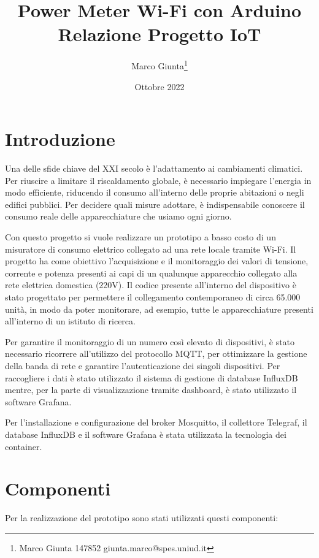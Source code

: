 \documentclass[italian,12pt,a4paper,oneside,final]{report}
\title{\huge Power Meter Wi-Fi con Arduino\\[0.5em]
\large Relazione Progetto IoT}
\date{Ottobre 2022}
\author{
Marco Giunta\thanks{Marco Giunta 147852 giunta.marco@spes.uniud.it}}
\begin{document}
\maketitle

\tableofcontents

\newpage

\section{Introduzione}
Una delle sfide chiave del XXI secolo è l’adattamento ai cambiamenti climatici.
Per riuscire a limitare il riscaldamento globale, è necessario impiegare l’energia in modo efficiente, riducendo il consumo all'interno delle proprie abitazioni o negli edifici pubblici.
Per decidere quali misure adottare, è indispensabile conoscere il consumo reale delle apparecchiature che usiamo ogni giorno.

Con questo progetto si vuole realizzare un prototipo a basso costo di un misuratore di consumo elettrico collegato ad una rete locale tramite \mbox{Wi-Fi}.
Il progetto ha come obiettivo l’acquisizione e il monitoraggio dei valori di tensione, corrente e potenza presenti ai capi di un qualunque apparecchio collegato alla rete elettrica domestica (220V).
Il codice presente all'interno del dispositivo è stato progettato per permettere il collegamento contemporaneo di circa 65.000 unità, in modo da poter monitorare, ad esempio, tutte le apparecchiature presenti all'interno di un istituto di ricerca.

Per garantire il monitoraggio di un numero così elevato di dispositivi, è stato necessario ricorrere all'utilizzo del protocollo MQTT, per ottimizzare la gestione della banda di rete e garantire l'autenticazione dei singoli dispositivi.
Per raccogliere i dati è stato utilizzato il sistema di gestione di database InfluxDB mentre, per la parte di visualizzazione tramite dashboard, è stato utilizzato il software Grafana.

Per l'installazione e configurazione del broker Mosquitto, il collettore Telegraf, il database InfluxDB e il software Grafana è stata utilizzata la tecnologia dei container.

\newpage

\section{Componenti}
Per la realizzazione del prototipo sono stati utilizzati questi componenti:
\end{document}
